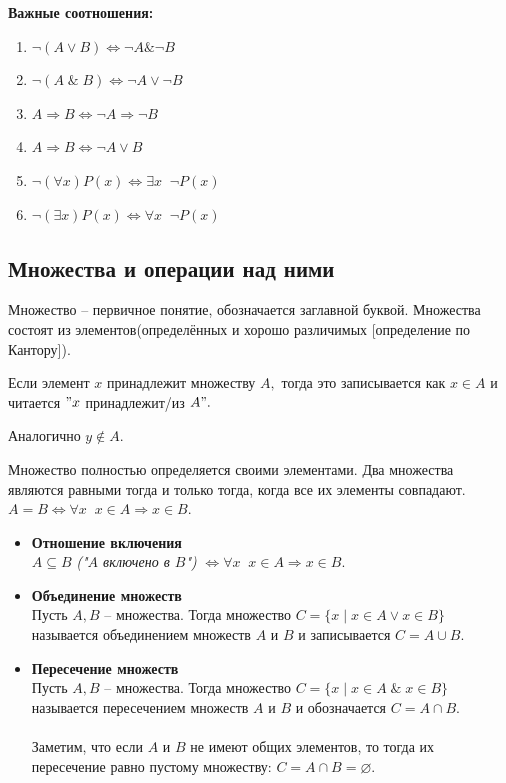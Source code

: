 {\bf Важные соотношения:}

\begin{enumerate}
\item $\neg(A\vee B) \Leftrightarrow \neg A \& \neg B$
\item $\neg(A\;\&\; B)\Leftrightarrow \neg A\vee\neg B$
\item $A \Rightarrow B  \Leftrightarrow \neg A\Rightarrow\neg B$
\item $A\Rightarrow B  \Leftrightarrow\neg A\vee B$
\item $\neg \left(\forall x\right) P(x) \Leftrightarrow \exists x \;\;\neg P(x)$
\item $\neg \left(\exists x\right) P(x) \Leftrightarrow \forall x \;\;\neg P(x)$
\end{enumerate}

\subsection{Множества и операции над ними}

\begin{Definition}
Множество -- первичное понятие, обозначается заглавной буквой. Множества состоят из элементов(определённых и хорошо различимых [определение по Кантору]).
\end{Definition}

Если элемент $x$ принадлежит множеству $A,$ тогда это записывается как $x\in A$ и читается $"x$ принадлежит/из $A".$

Аналогично $y\notin A.$

Множество полностью определяется своими элементами. Два множества являются равными тогда и только тогда, когда все их элементы совпадают.\\ $A=B \Leftrightarrow \forall x\;\; x\in A \Rightarrow x\in B.$

\begin{itemize}
\item {\bf Отношение включения}\\
$A\subseteq B$ \textit{ ("$A$ включено в $B$")} $\Leftrightarrow \forall x\;\; x\in A \Rightarrow x\in B.$

\item {\bf Объединение множеств}\\
Пусть $A, B$ -- множества. Тогда множество $C=\{x\mid x\in A \vee x\in B\}$ называется объединением множеств $A$ и $B$ и записывается $C=A\cup B.$

\item {\bf Пересечение множеств}\\
Пусть $A, B$ -- множества. Тогда множество $C=\{x\mid x\in A\;\&\; x\in B\}$ называется пересечением множеств $A$ и $B$ и обозначается $C=A\cap B.$\\
\\Заметим, что если $A$ и $B$ не имеют общих элементов, то тогда их пересечение равно пустому множеству: $C=A\cap B=\varnothing.$
\end{itemize}

